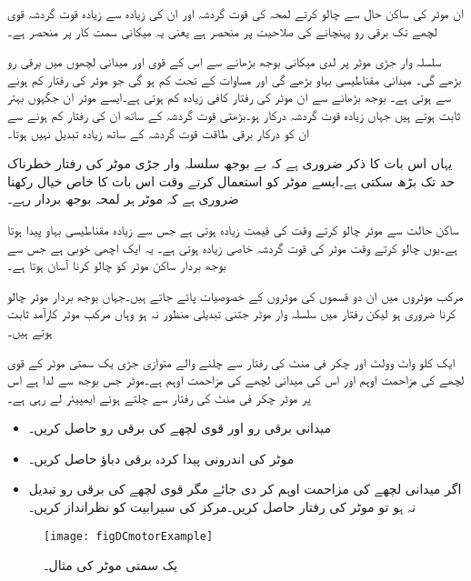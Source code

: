 ان موٹر کی ساکن حال سے چالو کرتے لمحہ کی قوت گردشہ اور ان کی زیادہ سے زیادہ قوت گردشہ قوی لچھے تک برقی رو پہنچانے کی صلاحیت پر منحصر ہے یعنی یہ میکانی سمت کار پر منحصر ہے۔

سلسلہ وار جڑی موٹر پر لدی میکانی بوجھ بڑھانے سے اس کے قوی اور میدانی لچھوں میں برقی رو بڑھے گی۔ میدانی مقناطیسی بہاو بڑھے گی اور مساوات   کے تحت  کم ہو گی جو موٹر کی رفتار کم ہونے سے ہوتی ہے۔ بوجھ بڑھانے سے ان موٹر کی رفتار کافی زیادہ کم ہوتی ہے۔ایسے موٹر ان جگہوں بہتر ثابت ہوتے ہیں جہاں زیادہ قوت گردشہ درکار ہو۔بڑھتی قوت گردشہ کے ساتھ ان کی رفتار کم ہونے سے ان کو درکار برقی طاقت قوت گردشہ کے ساتھ زیادہ تبدیل نہیں ہوتا۔

یہاں اس بات کا ذکر ضروری ہے کہ بے بوجھ سلسلہ وار جڑی موٹر کی رفتار خطرناک حد تک بڑھ سکتی ہے۔ایسے موٹر کو استعمال کرتے وقت اس بات کا خاص خیال رکھنا ضروری ہے کہ موٹر ہر لمحہ بوجھ بردار رہے۔

ساکن حالت سے موٹر چالو کرتے وقت    کی قیمت زیادہ ہوتی ہے جس سے زیادہ  مقناطیسی بہاو پیدا ہوتا ہے۔یوں چالو کرتے وقت موٹر کی قوت گردشہ خاصی زیادہ ہوتی ہے۔ یہ ایک اچھی خوبی ہے جس سے بوجھ بردار ساکن موٹر کو چالو کرنا آسان ہوتا ہے۔

مرکب موٹروں میں ان دو قسموں کی موٹروں کے خصوصیات پائے جاتے ہیں۔جہاں بوجھ بردار موٹر چالو کرنا ضروری ہو لیکن رفتار میں سلسلہ وار موٹر جتنی تبدیلی منظور نہ ہو وہاں مرکب موٹر کارآمد ثابت ہوتے ہیں۔

ایک   کلو واٹ  وولٹ اور  چکر فی منٹ کی رفتار سے چلنے والے متوازی جڑی یک سمتی موٹر کے قوی لچھے کی مزاحمت  اوہم اور اس کی میدانی لچھے کی مزاحمت   اوہم ہے۔موٹر جس بوجھ سے لدا ہے اس پر موٹر   چکر فی منٹ کی رفتار سے چلتے ہوئے   ایمپیئر لے رہی ہے۔ 
\begin{itemize}
\item
میدانی برقی رو اور قوی لچھے کی برقی رو حاصل کریں۔
\item
موٹر کی اندرونی پیدا کردہ برقی دباؤ حاصل کریں۔
\item
اگر میدانی لچھے کی مزاحمت  اوہم کر دی جائے  مگر قوی لچھے کی برقی رو تبدیل نہ ہو  تو موٹر کی رفتار حاصل کریں۔مرکز کی سیرابیت کو نظرانداز کریں۔
\end{itemize}

\begin{figure}
\centering
\texttt{[image: figDCmotorExample]}
\caption{یک سمتی موٹر کی مثال۔}
\label{شکل_یکسمتی_موٹر_کی_مثال}
\end{figure}

